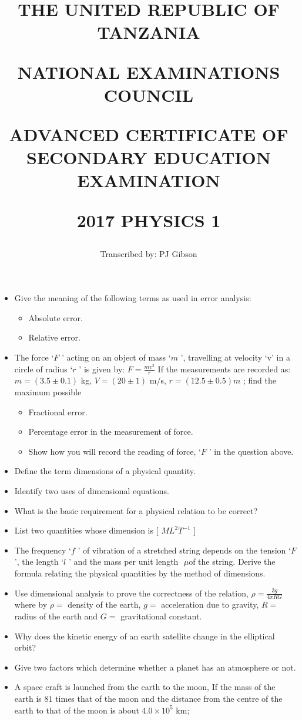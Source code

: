 \documentclass{article}
\title{THE UNITED REPUBLIC OF TANZANIA

NATIONAL EXAMINATIONS COUNCIL

ADVANCED CERTIFICATE OF SECONDARY EDUCATION EXAMINATION

\textbf{2017 PHYSICS 1}}
\author{Transcribed by:  PJ Gibson}
\begin{document}
\maketitle

\begin{itemize}
\item Give the meaning of the following terms as used in error analysis:
 \begin{itemize}
\item Absolute error. 
\item Relative error. 
\end{itemize}
\item The force ‘$ F$ ’ acting on an object of mass ‘$ m$ ’, travelling at velocity ‘v’ in a circle of radius ‘$ r$ ’ is given by: $ F= \frac{mv^{2}}{r}$ If the measurements are recorded as: $ m=(3.5 \pm 0.1)$ kg, $ V=(20\pm 1)$ m$/$s, $ r=(12.5\pm 0.5)m$ ; find the maximum possible
 \begin{itemize}
\item Fractional error. 
\item Percentage error in the measurement of force.
\item Show how you will record the reading of force, ‘$ F$ ’ in the question above. 
\end{itemize}
\item Define the term dimensions of a physical quantity. 
\item Identify two uses of dimensional equations.
\item What is the basic requirement for a physical relation to be correct? 
\item List two quantities whose dimension is [ $ ML^{2}T^{-1}$ ]
\item The frequency ‘$ f$ ’ of vibration of a stretched string depends on the tension ‘$ F$ ’, the length ‘$ l$ ’ and the mass per unit length $ $ $\mu$of the string. Derive the formula relating the physical quantities by the method of dimensions. 
\item Use dimensional analysis to prove the correctness of the relation, $ \rho = \frac{3g}{4 \pi RG}$ where by $ \rho =$ density of the earth, $ g=$ acceleration due to gravity, $ R=$ radius of the earth and $ G=$ gravitational constant.
\item Why does the kinetic energy of an earth satellite change in the elliptical orbit?
\item Give two factors which determine whether a planet has an atmosphere or not.
\item A space craft is launched from the earth to the moon, If the mass of the earth is $ 81$ times that of the moon and the distance from the centre of the earth to that of the moon is about $ 4.0 \times 10^{5}$ km;

\end{itemize}
\end{document}

